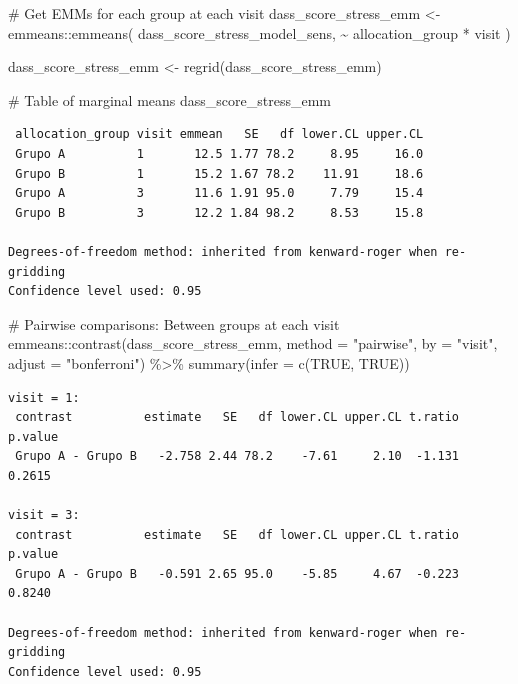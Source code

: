 \documentclass[
  letterpaper,
  DIV=11,
  numbers=noendperiod]{scrartcl}
\newenvironment{Shaded}{\begin{snugshade}}{\end{snugshade}}
\newcommand{\AttributeTok}[1]{\textcolor[rgb]{0.40,0.45,0.13}{#1}}
\newcommand{\CommentTok}[1]{\textcolor[rgb]{0.37,0.37,0.37}{#1}}
\newcommand{\ConstantTok}[1]{\textcolor[rgb]{0.56,0.35,0.01}{#1}}
\newcommand{\FunctionTok}[1]{\textcolor[rgb]{0.28,0.35,0.67}{#1}}
\newcommand{\NormalTok}[1]{\textcolor[rgb]{0.00,0.23,0.31}{#1}}
\newcommand{\OtherTok}[1]{\textcolor[rgb]{0.00,0.23,0.31}{#1}}
\newcommand{\SpecialCharTok}[1]{\textcolor[rgb]{0.37,0.37,0.37}{#1}}
\newcommand{\StringTok}[1]{\textcolor[rgb]{0.13,0.47,0.30}{#1}}
\begin{document}
\begin{Shaded}
\begin{Highlighting}[]
\CommentTok{\# Get EMMs for each group at each visit}
\NormalTok{dass\_score\_stress\_emm }\OtherTok{\textless{}{-}}\NormalTok{ emmeans}\SpecialCharTok{::}\FunctionTok{emmeans}\NormalTok{(}
\NormalTok{    dass\_score\_stress\_model\_sens, }
    \SpecialCharTok{\textasciitilde{}}\NormalTok{ allocation\_group }\SpecialCharTok{*}\NormalTok{ visit}
\NormalTok{)}

\NormalTok{dass\_score\_stress\_emm }\OtherTok{\textless{}{-}} \FunctionTok{regrid}\NormalTok{(dass\_score\_stress\_emm)}

\CommentTok{\# Table of marginal means}
\NormalTok{dass\_score\_stress\_emm}
\end{Highlighting}
\end{Shaded}

\begin{verbatim}
 allocation_group visit emmean   SE   df lower.CL upper.CL
 Grupo A          1       12.5 1.77 78.2     8.95     16.0
 Grupo B          1       15.2 1.67 78.2    11.91     18.6
 Grupo A          3       11.6 1.91 95.0     7.79     15.4
 Grupo B          3       12.2 1.84 98.2     8.53     15.8

Degrees-of-freedom method: inherited from kenward-roger when re-gridding 
Confidence level used: 0.95 
\end{verbatim}

\begin{Shaded}
\begin{Highlighting}[]
\CommentTok{\# Pairwise comparisons: Between groups at each visit}
\NormalTok{emmeans}\SpecialCharTok{::}\FunctionTok{contrast}\NormalTok{(dass\_score\_stress\_emm, }\AttributeTok{method =} \StringTok{"pairwise"}\NormalTok{, }\AttributeTok{by =} \StringTok{"visit"}\NormalTok{, }\AttributeTok{adjust =} \StringTok{"bonferroni"}\NormalTok{) }\SpecialCharTok{\%\textgreater{}\%} \FunctionTok{summary}\NormalTok{(}\AttributeTok{infer =} \FunctionTok{c}\NormalTok{(}\ConstantTok{TRUE}\NormalTok{, }\ConstantTok{TRUE}\NormalTok{))}
\end{Highlighting}
\end{Shaded}

\begin{verbatim}
visit = 1:
 contrast          estimate   SE   df lower.CL upper.CL t.ratio p.value
 Grupo A - Grupo B   -2.758 2.44 78.2    -7.61     2.10  -1.131  0.2615

visit = 3:
 contrast          estimate   SE   df lower.CL upper.CL t.ratio p.value
 Grupo A - Grupo B   -0.591 2.65 95.0    -5.85     4.67  -0.223  0.8240

Degrees-of-freedom method: inherited from kenward-roger when re-gridding 
Confidence level used: 0.95 
\end{verbatim}
\end{document}
